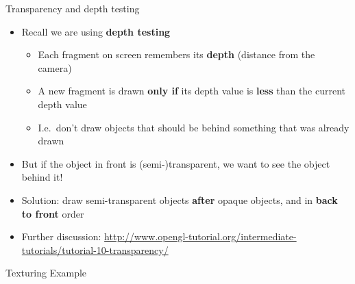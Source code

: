 \begin{frame}{Transparency and depth testing}
	\begin{itemize}
		\item Recall we are using \textbf{depth testing}
			\begin{itemize}
				\pause\item Each fragment on screen remembers its \textbf{depth} (distance from the camera)
				\pause\item A new fragment is drawn \textbf{only if} its depth value is \textbf{less} than the current depth value
				\pause\item I.e.\ don't draw objects that should be behind something that was already drawn
			\end{itemize}
		\pause\item But if the object in front is (semi-)transparent, we want to see the object behind it!
		\pause\item Solution: draw semi-transparent objects \textbf{after} opaque objects,
			and in \textbf{back to front} order
		\pause\item Further discussion: {\footnotesize\url{http://www.opengl-tutorial.org/intermediate-tutorials/tutorial-10-transparency/}}
	\end{itemize}
\end{frame}

\begin{frame}
\begin{center}
	Texturing Example
\end{center}
\end{frame}
